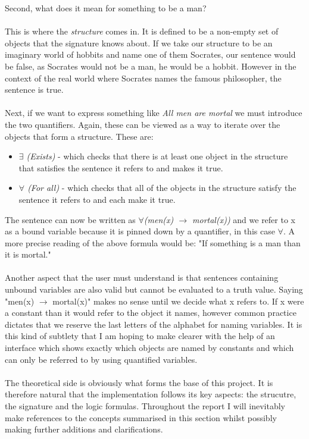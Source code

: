 \documentclass{report}
\begin{document}
Second, what does it mean for something to be a man? \\ \\
This is where the \emph{structure} comes in. It is defined to be a non-empty set of objects that the signature knows about. If we take our structure to be an
imaginary world of hobbits and name one of them Socrates, our sentence would be
false, as Socrates would not be a man, he would be a hobbit. However in the 
context of the real world where Socrates names the famous philosopher, the 
sentence is true. \\ \\
Next, if we want to express something like \emph{All men are mortal} we must 
introduce the two quantifiers. Again, these can be viewed as a way to iterate 
over the objects that form a structure. These are:
	\begin{itemize}
	\item \emph{$\exists$ (Exists)} 
  - which checks that there is at least one object in the structure that
  satisfies the sentence it refers to and makes it true.
	\item \emph{$\forall$ (For all)}
  - which checks that all of the objects in the structure satisfy the sentence 
  it refers to and each make it true.
	\end{itemize}
The sentence can now be written as
\emph{$\forall$(men(x) $\rightarrow$ mortal(x))}
and we refer to x as a bound variable because it is pinned down by a quantifier,
in this case $\forall$. A more precise reading of the above formula would be:
"If something is a man than it is mortal." \\ \\
Another aspect that the user must understand is that sentences containing 
unbound variables are also valid but cannot be evaluated to a truth value. 
Saying "men(x) $\rightarrow$ mortal(x)" makes no sense until we decide what x 
refers to. If x were a constant than it would refer to the object it names, 
however common practice dictates that we reserve the last letters of the 
alphabet for naming variables. It is this kind of subtlety that I am hoping
to make clearer with the help of an interface which shows exactly which objects
are named by constants and which can only be referred to by using quantified 
variables. \\ \\
The theoretical side is obviously what forms the base of this project. It is therefore natural that the implementation follows its key aspects: the strucutre, the signature and the logic formulas. Throughout the report I will inevitably make references to the concepts summarised in this section whilst possibly making further additions and clarifications.
\end{document}
